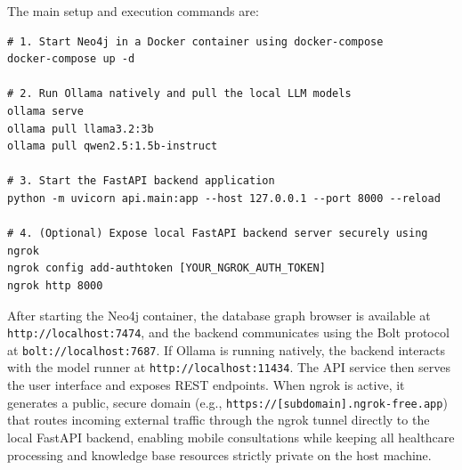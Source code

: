 \documentclass[../main.tex]{subfiles}
\begin{document}
The main setup and execution commands are:

\begin{verbatim}
# 1. Start Neo4j in a Docker container using docker-compose
docker-compose up -d

# 2. Run Ollama natively and pull the local LLM models
ollama serve
ollama pull llama3.2:3b
ollama pull qwen2.5:1.5b-instruct

# 3. Start the FastAPI backend application
python -m uvicorn api.main:app --host 127.0.0.1 --port 8000 --reload

# 4. (Optional) Expose local FastAPI backend server securely using ngrok
ngrok config add-authtoken [YOUR_NGROK_AUTH_TOKEN]
ngrok http 8000
\end{verbatim}

After starting the Neo4j container, the database graph browser is available at \nolinkurl{http://localhost:7474}, and the backend communicates using the Bolt protocol at \nolinkurl{bolt://localhost:7687}. If Ollama is running natively, the backend interacts with the model runner at \nolinkurl{http://localhost:11434}. The API service then serves the user interface and exposes REST endpoints. When ngrok is active, it generates a public, secure domain (e.g., \nolinkurl{https://[subdomain].ngrok-free.app}) that routes incoming external traffic through the ngrok tunnel directly to the local FastAPI backend, enabling mobile consultations while keeping all healthcare processing and knowledge base resources strictly private on the host machine.
\end{document}
